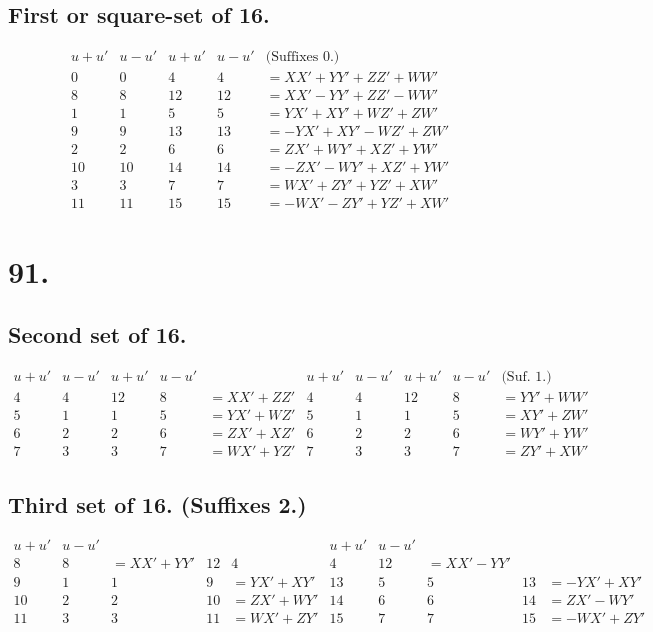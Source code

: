 \documentclass[11pt,a4paper]{book}
\begin{document}
\subsection*{First or square-set of 16.}

\[
\begin{array}{c|cccc}
u+u' & u-u' & u+u' & u-u' & \text{(Suffixes 0.)} \\
\hline
0 & 0 & 4 & 4 & = XX' + YY' + ZZ' + WW' \\
8 & 8 & 12 & 12 & = XX' - YY' + ZZ' - WW' \\
1 & 1 & 5 & 5 & = YX' + XY' + WZ' + ZW' \\
9 & 9 & 13 & 13 & = -YX' + XY' - WZ' + ZW' \\
2 & 2 & 6 & 6 & = ZX' + WY' + XZ' + YW' \\
10 & 10 & 14 & 14 & = -ZX' - WY' + XZ' + YW' \\
3 & 3 & 7 & 7 & = WX' + ZY' + YZ' + XW' \\
11 & 11 & 15 & 15 & = -WX' - ZY' + YZ' + XW'
\end{array}
\]

\newpage
\section*{91.}
\label{sec:91}

\subsection*{Second set of 16.}

\[
\begin{array}{c|cccc|cccc|c}
u+u' & u-u' & u+u' & u-u' & & u+u' & u-u' & u+u' & u-u' & \text{(Suf. 1.)} \\
\hline
4 & 4 & 12 & 8 & = XX' + ZZ' & 4 & 4 & 12 & 8 & = YY' + WW' \\
5 & 1 & 1 & 5 & = YX' + WZ' & 5 & 1 & 1 & 5 & = XY' + ZW' \\
6 & 2 & 2 & 6 & = ZX' + XZ' & 6 & 2 & 2 & 6 & = WY' + YW' \\
7 & 3 & 3 & 7 & = WX' + YZ' & 7 & 3 & 3 & 7 & = ZY' + XW'
\end{array}
\]

\subsection*{Third set of 16. (Suffixes 2.)}

\[
\begin{array}{c|cccc|c|cccc}
u+u' & u-u' & & & & u+u' & u-u' & & & \\
\hline
8 & 8 & = XX' + YY' & 12 & 4 & 4 & 12 & = XX' - YY' \\
9 & 1 & 1 & 9 & = YX' + XY' & 13 & 5 & 5 & 13 & = -YX' + XY' \\
10 & 2 & 2 & 10 & = ZX' + WY' & 14 & 6 & 6 & 14 & = ZX' - WY' \\
11 & 3 & 3 & 11 & = WX' + ZY' & 15 & 7 & 7 & 15 & = -WX' + ZY'
\end{array}
\]
\end{document}
